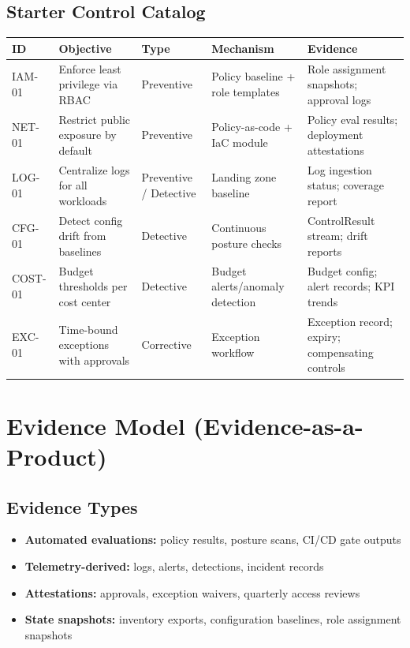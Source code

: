 \documentclass[11pt]{report}
\begin{document}
\subsection{Starter Control Catalog}
\begin{longtable}{@{}>{\raggedright\arraybackslash}p{} >{\raggedright\arraybackslash}p{} >{\raggedright\arraybackslash}p{} >{\raggedright\arraybackslash}p{} >{\raggedright\arraybackslash}p{}@{}}
\toprule
\textbf{ID} & \textbf{Objective} & \textbf{Type} & \textbf{Mechanism} & \textbf{Evidence} \\
\midrule
IAM-01 & Enforce least privilege via RBAC & Preventive & Policy baseline + role templates & Role assignment snapshots; approval logs \\
NET-01 & Restrict public exposure by default & Preventive & Policy-as-code + IaC module & Policy eval results; deployment attestations \\
LOG-01 & Centralize logs for all workloads & Preventive / Detective & Landing zone baseline & Log ingestion status; coverage report \\
CFG-01 & Detect config drift from baselines & Detective & Continuous posture checks & ControlResult stream; drift reports \\
COST-01 & Budget thresholds per cost center & Detective & Budget alerts/anomaly detection & Budget config; alert records; KPI trends \\
EXC-01 & Time-bound exceptions with approvals & Corrective & Exception workflow & Exception record; expiry; compensating controls \\
\bottomrule
\end{longtable}

\section{Evidence Model (Evidence-as-a-Product)}
\subsection{Evidence Types}
\begin{itemize}
  \item \textbf{Automated evaluations:} policy results, posture scans, CI/CD gate outputs
  \item \textbf{Telemetry-derived:} logs, alerts, detections, incident records
  \item \textbf{Attestations:} approvals, exception waivers, quarterly access reviews
  \item \textbf{State snapshots:} inventory exports, configuration baselines, role assignment snapshots
\end{itemize}
\end{document}
